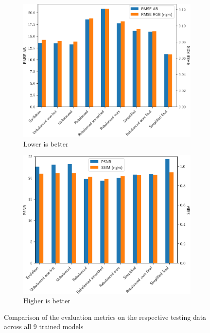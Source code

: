 \documentclass{article}
\begin{document}
\begin{figure}
    \centering
    \begin{subfigure}[b]{0.50\textwidth}
        \centering
        \includegraphics[width=\textwidth]{GRAPHS/rmse.png}
        \caption{Lower is better}
    \end{subfigure}
    \begin{subfigure}[b]{0.48\textwidth}
        \centering
        \includegraphics[width=\textwidth]{GRAPHS/psnr_ssim.png}
        \caption{Higher is better}
    \end{subfigure}
    \caption{Comparison of the evaluation metrics on the respective testing data across all 9 trained models}
    \label{fig:metrics}
\end{figure}
\end{document}
